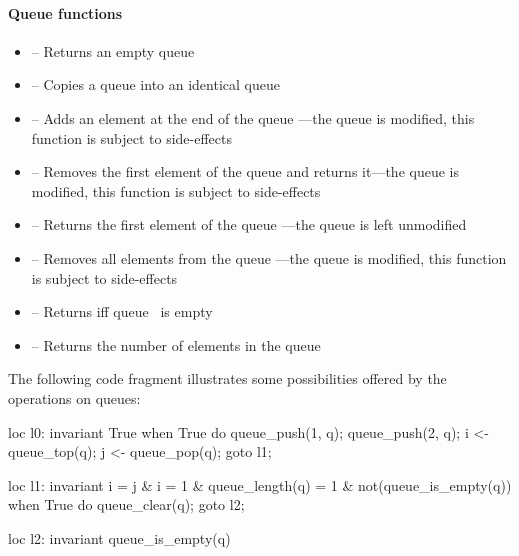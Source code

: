 \paragraph{Queue functions}

\begin{itemize}
	\item {} -- Returns an empty queue

	\item \label{item:lbl-queue_copy}  -- Copies a queue  into an identical queue

	\item \label{item:lbl-queue_push}  -- Adds an element  at the end of the queue ---the queue is modified, this function is subject to side-effects

	\item \label{item:lbl-queue_pop}  -- Removes the first element of the queue  and returns it---the queue is modified, this function is subject to side-effects

	\item \label{item:lbl-queue_top}  -- Returns the first element of the queue ---the queue is left unmodified

	\item \label{item:lbl-queue_clear}  -- Removes all elements from the queue ---the queue is modified, this function is subject to side-effects

	\item \label{item:lbl-queue_is_empty}  -- Returns  iff queue~ is empty

	\item \label{item:lbl-queue_length}  -- Returns the number of elements in the queue 
\end{itemize}

\begin{example}
	The following code fragment illustrates some possibilities offered by the operations on queues:

\begin{IMITATORmodel}
loc l0: invariant True
	when True do {
		queue_push(1, q);
		queue_push(2, q);
		i <- queue_top(q);
		j <- queue_pop(q);
	} goto l1;

loc l1: invariant
	i = j
	& i = 1
	& queue_length(q) = 1
	& not(queue_is_empty(q))
	when True do { queue_clear(q); } goto l2;

loc l2: invariant queue_is_empty(q)
\end{IMITATORmodel}

\end{example}


